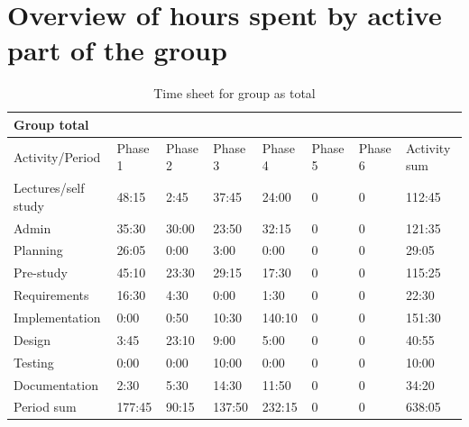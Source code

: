 \documentclass[11pt]{book}
\begin{document}
\section{Overview of hours spent by active part of the group}\label{sec:active_time_table}
\begin{table}[H]
\centering
\begin{tabular}{| l | l | l | l | l | l | l | l |}
    \hline
    Group total         &          &          &          &          &             &             &              \\ \hline                        
    Activity/Period     & Phase 1  & Phase 2  & Phase  3 & Phase 4  & Phase 5     & Phase 6     & Activity sum \\ \hline
    Lectures/self study & 48:15    & 2:45     & 37:45    & 24:00    & 0           & 0           & 112:45       \\ \hline
    Admin               & 35:30    & 30:00    & 23:50    & 32:15    & 0           & 0           & 121:35       \\ \hline
    Planning            & 26:05    & 0:00     & 3:00     & 0:00     & 0           & 0           & 29:05        \\ \hline
    Pre-study           & 45:10    & 23:30    & 29:15    & 17:30    & 0           & 0           & 115:25       \\ \hline
    Requirements        & 16:30    & 4:30     & 0:00     & 1:30     & 0           & 0           & 22:30        \\ \hline
    Implementation      & 0:00     & 0:50     & 10:30    & 140:10   & 0           & 0           & 151:30       \\ \hline
    Design              & 3:45     & 23:10    & 9:00     & 5:00     & 0           & 0           & 40:55        \\ \hline
    Testing             & 0:00     & 0:00     & 10:00    & 0:00     & 0           & 0           & 10:00        \\ \hline
    Documentation       & 2:30     & 5:30     & 14:30    & 11:50    & 0           & 0           & 34:20        \\ \hline
    Period sum          & 177:45   & 90:15    & 137:50   & 232:15   & 0           & 0           & 638:05       \\ \hline
\end{tabular}
\caption{Time sheet for group as total}
\label{tab:appendix_timesheets_group}
\end{table}
\end{document}
